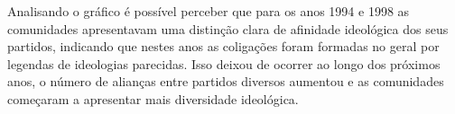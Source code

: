 Analisando o gráfico é possível perceber que para os anos 1994 e 1998 as comunidades apresentavam uma distinção clara de afinidade ideológica dos seus partidos, indicando que nestes anos as coligações foram formadas no geral por legendas de ideologias parecidas. Isso deixou de ocorrer ao longo dos próximos anos, o número de alianças entre partidos diversos aumentou e as comunidades começaram a apresentar mais diversidade ideológica.
